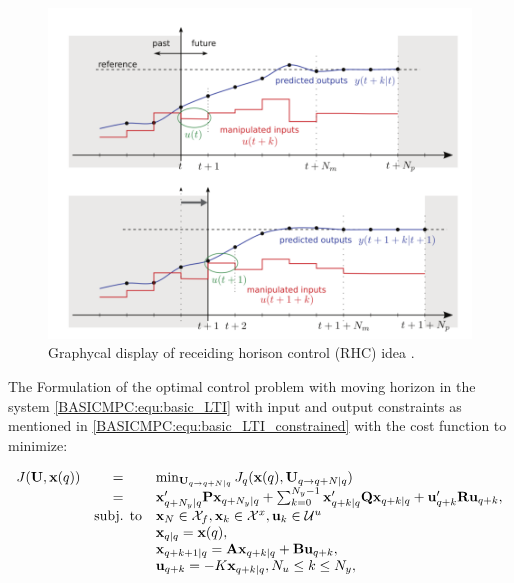 \begin{figure}[!ht]
        \centering
        \includegraphics[width=.9\textwidth]{EMPC_PNG_Pics/RHC.png}
        \caption{Graphycal display of receiding horison control (RHC) idea \cite{borrelli2017predictive}.}
        \label{BASICCSR:fig:RHC}
    \end{figure}

The Formulation of the optimal control problem with moving horizon \cite{goodwin2006constrained} in the system \ref{BASICMPC:equ:basic_LTI} with input and output constraints as mentioned in \ref{BASICMPC:equ:basic_LTI_constrained} with the cost function to minimize:
		
		\begin{equation}
        \begin{array}{rcl}
				J(\textbf{U},\textbf{x}(q))&=&\min_{\textbf{U}_{q\rightarrow q+N|q}}J_q(\textbf{x}(q),\textbf{U}_{q\rightarrow q+N|q})\\
                &=&\textbf{x}'_{q+N_y|q}\textbf{P}\textbf{x}_{q+N_y|q}+\sum^{N_y-1}_{k=0}\textbf{x}'_{q+k|q}\textbf{Q}\textbf{x}_{q+k|q}+\textbf{u}'_{q+k}\textbf{R}\textbf{u}_{q+k},\\
				&\textnormal{subj. to}&\textbf{x}_N\in\mathcal{X}_f,\textbf{x}_k\in\mathcal{X}^x,\textbf{u}_k\in\mathcal{U}^u\\
				&&\textbf{x}_{q|q}=\textbf{x}(q),\\
				&&\textbf{x}_{q+k+1|q}=\textbf{A}\textbf{x}_{q+k|q}+\textbf{B}\textbf{u}_{q+k},\\
				&&\textbf{u}_{q+k}=-K\textbf{x}_{q+k|q}, N_u\leq k\leq N_y,\\
        \end{array}
        \label{BASICMPC:equ:receiding_horison_problem}
    \end{equation}
		
